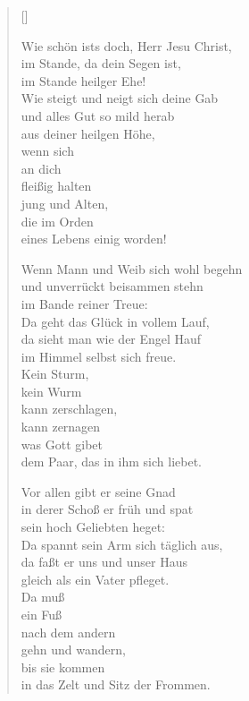 \begin{multicols}{2}
\settowidth{\versewidth}{Wie schön ists doch, Herr Jesu Christ,}
\begin{verse}[\versewidth]

 Wie schön ists doch, Herr Jesu Christ,\\
im Stande, da dein Segen ist,\\
im Stande heilger Ehe!\\
Wie steigt und neigt sich deine Gab\\
und alles Gut so mild herab\\
aus deiner heilgen Höhe,\\
wenn sich\\
an dich\\
fleißig halten\\
jung und Alten,\\
die im Orden\\
eines Lebens einig worden!

 Wenn Mann und Weib sich wohl begehn\\
und unverrückt beisammen stehn\\
im Bande reiner Treue:\\
Da geht das Glück in vollem Lauf,\\
da sieht man wie der Engel Hauf\\
im Himmel selbst sich freue.\\
Kein Sturm,\\
kein Wurm\\
kann zerschlagen,\\
kann zernagen\\
was Gott gibet\\
dem Paar, das in ihm sich liebet.

 Vor allen gibt er seine Gnad\\
in derer Schoß er früh und spat\\
sein hoch Geliebten heget:\\
Da spannt sein Arm sich täglich aus,\\
da faßt er uns und unser Haus\\
gleich als ein Vater pfleget.\\
Da muß\\
ein Fuß\\
nach dem andern\\
gehn und wandern,\\
bis sie kommen\\
in das Zelt und Sitz der Frommen.


\end{verse}
\end{multicols}
